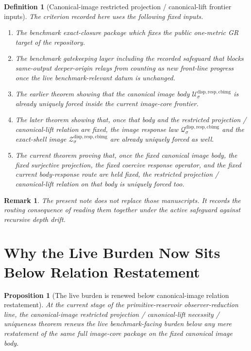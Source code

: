 \documentclass[11pt]{article}
\newcommand{\CanonicalImageBody}[1]{\mathcal U_{#1}^{\mathrm{disp,resp,cbimg}}}
\newcommand{\CanonicalImageShell}[1]{\mathcal Z_{#1}^{\mathrm{disp,resp,cbimg}}}
\newcommand{\CanonicalImageResponseLaw}[1]{\mathscr Q_{#1}^{\mathrm{disp,resp,cbimg}}}
\newtheorem{definition}{Definition}
\newtheorem{proposition}{Proposition}
\newtheorem{remark}{Remark}
\begin{document}
\begin{definition}[Canonical-image restricted projection / canonical-lift frontier inputs]
The criterion recorded here uses the following fixed inputs.
\begin{enumerate}
    \item The benchmark exact-closure package which fixes the public one-metric GR target of the repository.
    \item The benchmark gatekeeping layer including the recorded safeguard that blocks same-output deeper-origin relays from counting as new front-line progress once the live benchmark-relevant datum is unchanged.
    \item The earlier theorem showing that the canonical image body \(\CanonicalImageBody{\sigma}\) is already uniquely forced inside the current image-core frontier.
    \item The later theorem showing that, once that body and the restricted projection / canonical-lift relation are fixed, the image response law \(\CanonicalImageResponseLaw{\sigma}\) and the exact-shell image \(\CanonicalImageShell{\sigma}\) are already uniquely forced as well.
    \item The current theorem proving that, once the fixed canonical image body, the fixed surjective projection, the fixed coercive response operator, and the fixed current body-response route are held fixed, the restricted projection / canonical-lift relation on that body is uniquely forced too.
\end{enumerate}
\end{definition}

\begin{remark}
The present note does not replace those manuscripts. It records the routing consequence of reading them together under the active safeguard against recursive depth drift.
\end{remark}

\section{Why the Live Burden Now Sits Below Relation Restatement}

\begin{proposition}[The live burden is renewed below canonical-image relation restatement]
At the current stage of the primitive-reservoir observer-reduction line, the canonical-image restricted projection / canonical-lift necessity / uniqueness theorem renews the live benchmark-facing burden below any mere restatement of the same full image-core package on the fixed canonical image body.
\end{proposition}
\end{document}

